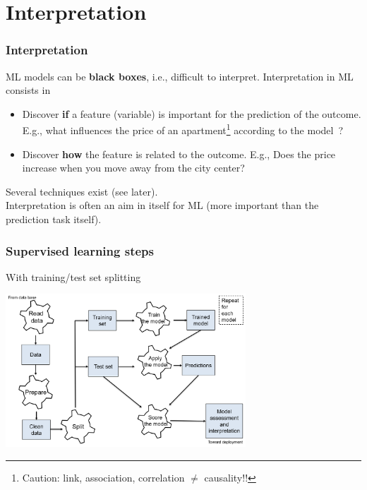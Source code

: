 \section{Interpretation}
\begin{frame}
\frametitle{Interpretation}
ML models can be {\bf black boxes}, i.e., difficult to interpret. Interpretation in ML consists in 
\begin{itemize}
\item Discover {\bf if} a feature (variable) is important for the prediction of the outcome. E.g., what influences the price of an apartment\footnote{Caution: link, association, correlation $\neq$ causality!!} according to the model~?
\item Discover {\bf how} the feature is related to the outcome. E.g., Does the price increase when you move away from the city center?
\end{itemize}
Several techniques exist (see later).\\
\vspace{0.3cm} 
Interpretation is often an aim in itself for ML (more important than the prediction task itself). 
\end{frame}
\begin{frame}
\frametitle{Supervised learning steps}
\small
With training/test set splitting\\
\normalsize
\begin{center}
\includegraphics[width=9cm]{../Graphs/ML_steps.png}
\end{center}
\end{frame}
